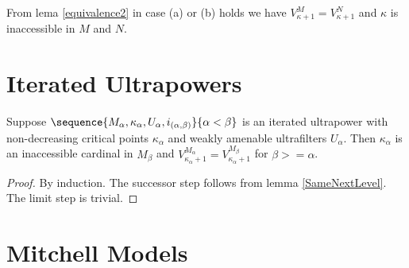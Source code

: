 \documentclass[oneside,12pt]{amsart}
\begin{document}
From lema \ref{equivalence2} in case (a) or (b) holds we have
$V^{M}_{\kappa+1} = V^{N}_{\kappa+1}$ and $\kappa$ is inaccessible
in $M$ and $N$.


\section{Iterated Ultrapowers}

\begin{lemma}
Suppose $\sequence{M_{\alpha}, \kappa_{\alpha}, U_{\alpha}, i_{(\alpha, \beta)}}{\alpha<\beta}$
is an iterated ultrapower with non-decreasing critical points $\kappa_{\alpha}$ and weakly amenable
ultrafilters $U_{\alpha}$. Then $\kappa_{\alpha}$ is an inaccessible cardinal in
$M_{\beta}$ and $V^{M_{\alpha}}_{\kappa_{\alpha} + 1} = V^{M_{\beta}}_{\kappa_{\alpha} + 1}$
for $\beta>=\alpha$.
\end{lemma}
\begin{proof}
By induction. The successor step follows from lemma \ref{SameNextLevel}. The limit step is trivial.
\end{proof}


\section{Mitchell Models}
\end{document}
